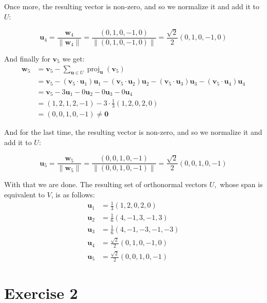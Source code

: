 \documentclass{article}
\begin{document}
Once more, the resulting vector is non-zero, and so we normalize it and add it to $U$:

$$\mathbf u_4=\frac{\mathbf w_4}{\|\mathbf w_4\|}=\frac{(0,1,0,-1,0)}{\|(0,1,0,-1,0)\|}=\boxed{\frac{\sqrt 2}{2}(0,1,0,-1,0)}$$

And finally for $\mathbf v_5$ we get:
\begin{align*}
  \mathbf w_5 &=\mathbf v_5-\sum_{\mathbf u\in U}\operatorname{proj}_\mathbf u(\mathbf v_5)\\
  &=\mathbf v_5-(\mathbf v_5\cdot\mathbf u_1)\mathbf u_1-(\mathbf v_5\cdot\mathbf u_2)\mathbf u_2-(\mathbf v_5\cdot\mathbf u_3)\mathbf u_3-(\mathbf v_5\cdot\mathbf u_4)\mathbf u_4\\
  &=\mathbf v_5-3\mathbf u_1-0\mathbf u_2-0\mathbf u_3-0\mathbf u_4\\
  &=(1, 2, 1, 2, -1)-3\cdot\frac{1}{3}(1, 2, 0, 2, 0)\\
  &=(0,0,1,0,-1)\not=\mathbf0
\end{align*}

And for the last time, the resulting vector is non-zero, and so we normalize it and add it to $U$:

$$\mathbf u_5=\frac{\mathbf w_5}{\|\mathbf w_5\|}=\frac{(0,0,1,0,-1)}{\|(0,0,1,0,-1)\|}=\boxed{\frac{\sqrt 2}{2}(0,0,1,0,-1)}$$

With that we are done. The resulting set of orthonormal vectors $U,$ whose span is equivalent to $V$, is as follows:
\begin{align*}
  \mathbf u_1&=\frac{1}{3}(1, 2, 0, 2, 0)\\
  \mathbf u_2&=\frac{1}{6}(4, -1, 3, -1, 3)\\
  \mathbf u_3&=\frac{1}{6}(4,-1,-3,-1,-3)\\
  \mathbf u_4&=\frac{\sqrt 2}{2}(0,1,0,-1,0)\\
  \mathbf u_5&=\frac{\sqrt 2}{2}(0,0,1,0,-1)
\end{align*}

\section*{Exercise 2}
\end{document}
